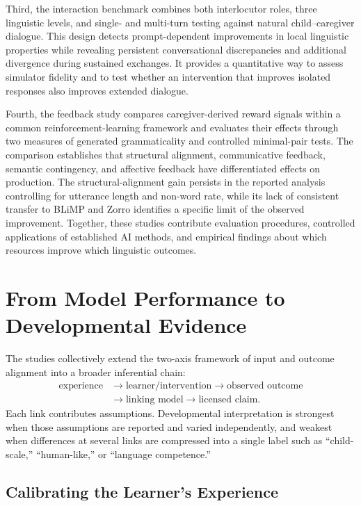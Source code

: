 Third, the interaction benchmark combines both interlocutor roles, three linguistic levels, and single- and multi-turn testing against natural child--caregiver dialogue. This design detects prompt-dependent improvements in local linguistic properties while revealing persistent conversational discrepancies and additional divergence during sustained exchanges. It provides a quantitative way to assess simulator fidelity and to test whether an intervention that improves isolated responses also improves extended dialogue.

Fourth, the feedback study compares caregiver-derived reward signals within a common reinforcement-learning framework and evaluates their effects through two measures of generated grammaticality and controlled minimal-pair tests. The comparison establishes that structural alignment, communicative feedback, semantic contingency, and affective feedback have differentiated effects on production. The structural-alignment gain persists in the reported analysis controlling for utterance length and non-word rate, while its lack of consistent transfer to BLiMP and Zorro identifies a specific limit of the observed improvement. Together, these studies contribute evaluation procedures, controlled applications of established AI methods, and empirical findings about which resources improve which linguistic outcomes.

\section{From Model Performance to Developmental Evidence}
\label{sec:gd_calibration}

The studies collectively extend the two-axis framework of input and outcome alignment into a broader inferential chain:
\[
\begin{aligned}
\text{experience} &\longrightarrow \text{learner/intervention}
\longrightarrow \text{observed outcome} \\
&\longrightarrow \text{linking model}
\longrightarrow \text{licensed claim}.
\end{aligned}
\]
Each link contributes assumptions. Developmental interpretation is strongest when those assumptions are reported and varied independently, and weakest when differences at several links are compressed into a single label such as ``child-scale,'' ``human-like,'' or ``language competence.''

\subsection{Calibrating the Learner's Experience}
\label{sec:gd_calibration_input}

